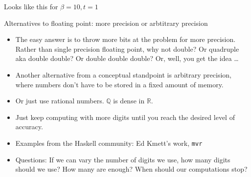 \documentclass{beamer}
\begin{document}
\begin{frame}{Looks like this for $\beta=10, t=1$}

\end{frame}

\begin{frame}{Alternatives to floating point: more precision or arbtitrary precision}
\begin{itemize}
\item The easy answer is to throw more bits at the problem for more precision. Rather than single precision 				floating point, why not double? Or quadruple aka double double? Or double double double? Or, well, you 				get the idea \ldots
\item Another alternative from a conceptual standpoint is arbitrary precision, where numbers don't have to be
			stored in a fixed amount of memory.
\item Or just use rational numbers. $\mathbb{Q}$ is dense in $\mathbb{R}$.
\item Just keep computing with more digits until you reach the desired level of accuracy.
\item Examples from the Haskell community: Ed Kmett's work, \texttt{mvr}
\item Questions: If we can vary the number of digits we use, how many digits should we use? How many are 
			enough? When should our computations stop?
\end{itemize}
\end{frame}
\end{document}
